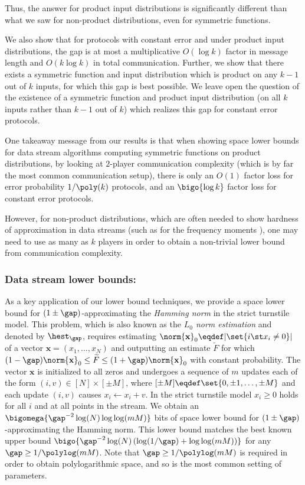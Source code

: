 Thus, the answer for product input distributions is significantly different than what we saw for non-product distributions, even for symmetric functions. 

We also show that for protocols with constant error and under product input distributions, the gap is at most a multiplicative $O(\log k)$ factor in message length and $O(k \log k)$ in total communication. Further, we show that there exists a symmetric function and input distribution which is product on any $k-1$ out of $k$ inputs, for which this gap is best possible. We leave open the question of the existence of a symmetric function and product input distribution (on all $k$ inputs rather than $k-1$ out of $k$) which realizes this gap for constant error protocols.

One takeaway message from our results is that when showing space lower bounds for data stream algorithms computing symmetric functions on product distributions, by looking at $2$-player communication complexity (which is by far the most common communication setup), there is only an $O(1)$ factor loss for error probability $1/\poly(k)$ protocols, and an $\bigo{\log k}$ factor loss for constant error protocols. 

However, for non-product distributions, which are often needed to show hardness of approximation in data streams (such as for the frequency moments \cite{BarYossef:2004eya}), one may need to use as many as $k$ players in order to obtain a non-trivial lower bound from communication complexity. 

\subsubsection{Data stream lower bounds:}
\label{para:Hamming estimation}
As a key application of our lower bound techniques, we provide a space
lower bound for $(1\pm\gap)$-approximating the \emph{Hamming norm} in the strict turnstile model.
This problem, which is also known as the \emph{$L_0$ norm estimation} and denoted by $\hest_\gap$, requires estimating $\norm{\mathbf{x}}_0  \eqdef |\set{i \st x_i \ne 0}|$ of a vector $\mathbf{x} = (x_1, \ldots, x_N)$ and outputting an estimate $\widetilde{F}$ for which $(1-\gap)\norm{\mathbf{x}}_0\le \widetilde{F} \le (1+\gap)\norm{\mathbf{x}}_0 $ with constant probability. 
The vector $\mathbf{x}$ is initialized to all zeros and undergoes a sequence of $m$ updates each of the form 
$(i,v)\in [N]\times [\pm M]$, 
where $[\pm M]\eqdef \set{0,\pm 1,\dots,\pm M}$ and each update $(i,v)$ causes $x_i\gets x_i+v$.
In the strict turnstile model $x_i \geq 0$ holds for all $i$ and at all points in the stream.
%
We obtain an $\bigomega{\gap^{-2}\log(N)\log\log(mM)}$ bits of space lower bound for  $(1\pm\gap)$-approximating the {Hamming norm}.
This lower bound matches the best known upper bound $\bigo{\gap^{-2}\log(N)\left(\log(1/\gap)+\log \log (mM)\right)}$ \cite{KNW10} for any $\gap\ge 1/\polylog(mM)$. Note that $\gap \geq 1/\polylog(mM)$ is required in order to obtain polylogarithmic space, and so is the most common setting of parameters.

